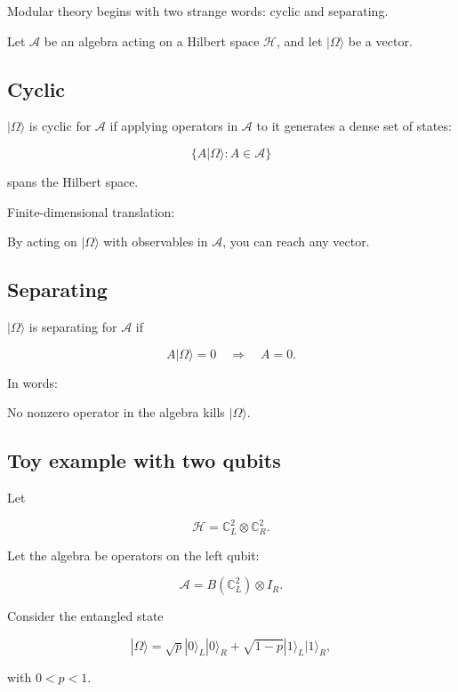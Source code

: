 \documentclass[11pt,a4paper]{article}
\newenvironment{qiqtquote}{\begin{mdframed}[style=quotestyle]}{\end{mdframed}}
\begin{document}
Modular theory begins with two strange words: cyclic and separating.

Let $\mathcal{A}$ be an algebra acting on a Hilbert space $\mathcal{H}$, and let $|\Omega\rangle$ be a vector.

\subsection{Cyclic}

$|\Omega\rangle$ is cyclic for $\mathcal{A}$ if applying operators in $\mathcal{A}$ to it generates a dense set of states:

\[
\{A|\Omega\rangle:A\in\mathcal{A}\}
\]

spans the Hilbert space.

Finite-dimensional translation:

\begin{qiqtquote}
By acting on $|\Omega\rangle$ with observables in $\mathcal{A}$, you can reach any vector.
\end{qiqtquote}

\subsection{Separating}

$|\Omega\rangle$ is separating for $\mathcal{A}$ if

\[
A|\Omega\rangle=0
\quad\Rightarrow\quad
A=0.
\]

In words:

\begin{qiqtquote}
No nonzero operator in the algebra kills $|\Omega\rangle$.
\end{qiqtquote}

\subsection{Toy example with two qubits}

Let

\[
\mathcal{H}=\mathbb{C}^2_L\otimes \mathbb{C}^2_R.
\]

Let the algebra be operators on the left qubit:

\[
\mathcal{A}=B(\mathbb{C}^2_L)\otimes I_R.
\]

Consider the entangled state

\[
|\Omega\rangle
=
\sqrt{p}|0\rangle_L|0\rangle_R
+
\sqrt{1-p}|1\rangle_L|1\rangle_R,
\]

with $0<p<1$.
\end{document}
